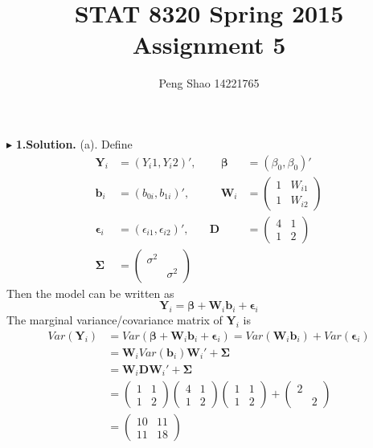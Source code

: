 \documentclass[letterpaper, 12pt]{article}
\newcommand{\ba}{$$\begin{aligned}}
\newcommand{\ea}{\end{aligned}$$}
\begin{document}
\title{STAT 8320 Spring 2015 Assignment 5}
\author{Peng Shao 14221765}
\maketitle
\indent




$\blacktriangleright$ \textbf{1.\quad Solution.} 
(a). Define
\ba
\bm{Y}_i&=(Y_i1,Y_i2)',&\quad\bm{\beta}&=(\beta_0,\beta_0)'\\
\bm{b}_i&=(b_{0i},b_{1i})', &\quad\bm{W}_i&=\left(\begin{matrix}
1&W_{i1}\\
1&W_{i2}
\end{matrix}\right)\\
\bm{\epsilon}_i&=(\epsilon_{i1},\epsilon_{i2})',\quad&\bm{D}&=\left(\begin{matrix}
4 &1\\
1 &2
\end{matrix}\right)\\
\bm{\Sigma}&=\left(\begin{matrix}
\sigma^2\\
&\sigma^2
\end{matrix}\right)
\ea
Then the model can be written as
$$
\bm{Y}_i=\bm{\beta}+\bm{W}_i\bm{b}_i+\bm{\epsilon}_i
$$
The marginal variance/covariance matrix of $\bm{Y}_i$ is 
\ba
Var(\bm{Y}_i)&=Var(\bm{\beta}+\bm{W}_i\bm{b}_i+\bm{\epsilon}_i)=Var(\bm{W}_i\bm{b}_i)+Var(\bm{\epsilon}_i)\\
&=\bm{W}_iVar(\bm{b}_i)\bm{W}_i'+\bm{\Sigma}\\
&=\bm{W}_i\bm{D}\bm{W}_i'+\bm{\Sigma}\\
&=\left(\begin{matrix}
1&1\\
1&2
\end{matrix}\right)\left(\begin{matrix}
4&1\\
1&2
\end{matrix}\right)\left(\begin{matrix}
1&1\\
1&2
\end{matrix}\right)+\left(\begin{matrix}
2\\
&2
\end{matrix}\right)\\
&=\left(\begin{matrix}
10&11\\
11&18
\end{matrix}\right)
\ea
\end{document}
